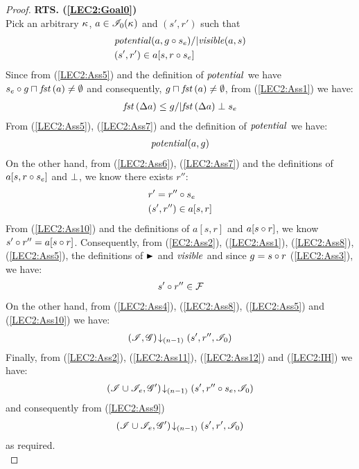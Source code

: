 \begin{lemma}
\begin{proof}
\noindent\textbf{RTS. (\ref{LEC2:Goal0})}\\
Pick an arbitrary $\kappa_{}$, $a \in \mathscr{I}_0(\kappa_{})$ and $(s', r')$ such that
%
\begin{align}
	& \mathit{potential}(a, g \circ s_e) /| \mathit{visible}(a, s) \label{LEC2:Ass5}\\
	& (s', r') \in a[s, r \circ s_e] \label{LEC2:Ass6}
\end{align}
Since from (\ref{LEC2:Ass5}) and the definition of $\mathit{potential}$ we have $s_e \circ g \sqcap_{} \mathit{fst}\left(a\right) \not= \emptyset$ and consequently, $g \sqcap_{} \mathit{fst}\left(a\right) \not= \emptyset$, from (\ref{LEC2:Ass1}) we have:
%
\begin{align}
	\mathit{fst}\left(\Delta {a}\right) \leq g /| \mathit{fst}\left(\Delta {a}\right) \mathrel{\bot} s_e \label{LEC2:Ass7}
\end{align}
% 
From (\ref{LEC2:Ass5}), (\ref{LEC2:Ass7}) and the definition of $\mathit{potential}$ we have:
%
\begin{align}
	\mathit{potential}(a, g) \label{LEC2:Ass8}
\end{align}
%
On the other hand, from (\ref{LEC2:Ass6}), (\ref{LEC2:Ass7}) and the definitions of $a[s, r \circ s_e]$ and $\mathrel{\bot}$, we know there exists $r''$: 
%
\begin{align}
	& r' = r'' \circ s_e \label{LEC2:Ass9}\\
	& (s', r'') \in a[s, r]  \label{LEC2:Ass10}
\end{align}
%
From (\ref{LEC2:Ass10}) and the definitions of $a[s, r]$ and $a[s \circ r]$, we know $s' \circ r'' = a[s \circ r]$. Consequently, from (\ref{EC2:Ass2}), (\ref{LEC2:Ass1}), (\ref{LEC2:Ass8}), (\ref{LEC2:Ass5}), the definitions of $\strictfences$ and $\mathit{visible}$ and since $g = s \circ r$ (\ref{LEC2:Ass3}), we have:
%
\begin{align}
	s' \circ r'' \in \mathcal{F}_{}  \label{LEC2:Ass11}
\end{align}
On the other hand, from (\ref{LEC2:Ass4}), (\ref{LEC2:Ass8}), (\ref{LEC2:Ass5}) and (\ref{LEC2:Ass10}) we have:
%
\begin{align}
	\left(\mathscr{I}, \mathscr{G}\right) \!\downarrow_{(n-1)} \left(s', r'', \mathscr{I}_0\right) \label{LEC2:Ass12}
\end{align}
%
Finally, from (\ref{LEC2:Ass2}), (\ref{LEC2:Ass11}), (\ref{LEC2:Ass12}) and (\ref{LEC2:IH}) we have:
%
\begin{align*}
	\left(\mathscr{I} \cup \mathscr{I}_{e}, \mathscr{G}'\right) \!\downarrow_{(n-1)} \left(s', r'' \circ s_e, \mathscr{I}_0\right)
\end{align*}
%
and consequently from (\ref{LEC2:Ass9})
%
\begin{align*}
	\left(\mathscr{I} \cup \mathscr{I}_{e}, \mathscr{G}'\right) \!\downarrow_{(n-1)} \left(s', r', \mathscr{I}_0\right)
\end{align*}
%
as required.\\
%
%
%


\end{proof}
\end{lemma}
